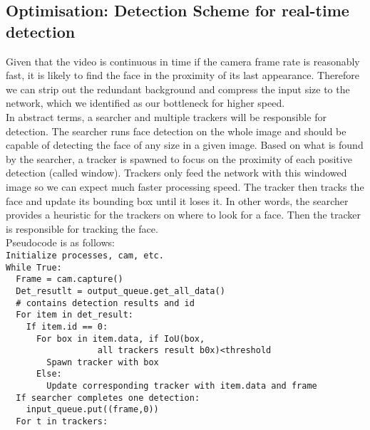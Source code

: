 \subsection{Optimisation: Detection Scheme for real-time detection}
Given that the video is continuous in time if the camera frame rate is reasonably fast, it is likely to find the face in the proximity of its last appearance. Therefore we can strip out the redundant background and compress the input size to the network, which we identified as our bottleneck for higher speed.\\[.2in]
In abstract terms, a searcher and multiple trackers will be responsible for detection. The searcher runs face detection on the whole image and should be capable of detecting the face of any size in a given image. Based on what is found by the searcher, a tracker is spawned to focus on the proximity of each positive detection (called window). Trackers only feed the network with this windowed image so we can expect much faster processing speed. The tracker then tracks the face and update its bounding box until it loses it. In other words, the searcher provides a heuristic for the trackers on where to look for a face. Then the tracker is responsible for tracking the face.\\[.2in]
Pseudocode is as follows:\\[.2in]
\verb#Initialize processes, cam, etc.#\\[.2in]
\verb#While True:#\\
\verb#  Frame = cam.capture()#\\
\verb|  Det_resutlt = output_queue.get_all_data()|\\
\verb|  # contains detection results and id |\\[.2in]
\verb#  For item in det_result:#\\
\verb#    If item.id == 0:#\\
\verb#      For box in item.data, if IoU(box, #\\
\verb#                  all trackers result b0x)<threshold#\\
\verb#        Spawn tracker with box#\\
\verb#      Else:#\\
\verb#        Update corresponding tracker with item.data and frame#\\
\verb#  If searcher completes one detection:#\\
\verb#    input_queue.put((frame,0))#\\[.2in]
\verb#  For t in trackers:#\\

